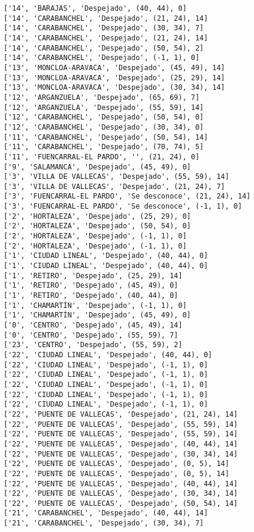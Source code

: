 \documentclass[11pt]{article}
\begin{document}
\begin{Verbatim}[commandchars=\\\{\}]
['14', 'BARAJAS', 'Despejado', (40, 44), 0]
['14', 'CARABANCHEL', 'Despejado', (21, 24), 14]
['14', 'CARABANCHEL', 'Despejado', (30, 34), 7]
['14', 'CARABANCHEL', 'Despejado', (21, 24), 14]
['14', 'CARABANCHEL', 'Despejado', (50, 54), 2]
['14', 'CARABANCHEL', 'Despejado', (-1, 1), 0]
['13', 'MONCLOA-ARAVACA', 'Despejado', (45, 49), 14]
['13', 'MONCLOA-ARAVACA', 'Despejado', (25, 29), 14]
['13', 'MONCLOA-ARAVACA', 'Despejado', (30, 34), 14]
['12', 'ARGANZUELA', 'Despejado', (65, 69), 7]
['12', 'ARGANZUELA', 'Despejado', (55, 59), 14]
['12', 'CARABANCHEL', 'Despejado', (50, 54), 0]
['12', 'CARABANCHEL', 'Despejado', (30, 34), 0]
['11', 'CARABANCHEL', 'Despejado', (50, 54), 14]
['11', 'CARABANCHEL', 'Despejado', (70, 74), 5]
['11', 'FUENCARRAL-EL PARDO', '', (21, 24), 0]
['9', 'SALAMANCA', 'Despejado', (45, 49), 0]
['3', 'VILLA DE VALLECAS', 'Despejado', (55, 59), 14]
['3', 'VILLA DE VALLECAS', 'Despejado', (21, 24), 7]
['3', 'FUENCARRAL-EL PARDO', 'Se desconoce', (21, 24), 14]
['3', 'FUENCARRAL-EL PARDO', 'Se desconoce', (-1, 1), 0]
['2', 'HORTALEZA', 'Despejado', (25, 29), 0]
['2', 'HORTALEZA', 'Despejado', (50, 54), 0]
['2', 'HORTALEZA', 'Despejado', (-1, 1), 0]
['2', 'HORTALEZA', 'Despejado', (-1, 1), 0]
['1', 'CIUDAD LINEAL', 'Despejado', (40, 44), 0]
['1', 'CIUDAD LINEAL', 'Despejado', (40, 44), 0]
['1', 'RETIRO', 'Despejado', (25, 29), 14]
['1', 'RETIRO', 'Despejado', (45, 49), 0]
['1', 'RETIRO', 'Despejado', (40, 44), 0]
['1', 'CHAMARTÍN', 'Despejado', (-1, 1), 0]
['1', 'CHAMARTÍN', 'Despejado', (45, 49), 0]
['0', 'CENTRO', 'Despejado', (45, 49), 14]
['0', 'CENTRO', 'Despejado', (55, 59), 7]
['23', 'CENTRO', 'Despejado', (55, 59), 2]
['22', 'CIUDAD LINEAL', 'Despejado', (40, 44), 0]
['22', 'CIUDAD LINEAL', 'Despejado', (-1, 1), 0]
['22', 'CIUDAD LINEAL', 'Despejado', (-1, 1), 0]
['22', 'CIUDAD LINEAL', 'Despejado', (-1, 1), 0]
['22', 'CIUDAD LINEAL', 'Despejado', (-1, 1), 0]
['22', 'CIUDAD LINEAL', 'Despejado', (-1, 1), 0]
['22', 'PUENTE DE VALLECAS', 'Despejado', (21, 24), 14]
['22', 'PUENTE DE VALLECAS', 'Despejado', (55, 59), 14]
['22', 'PUENTE DE VALLECAS', 'Despejado', (55, 59), 14]
['22', 'PUENTE DE VALLECAS', 'Despejado', (40, 44), 14]
['22', 'PUENTE DE VALLECAS', 'Despejado', (30, 34), 14]
['22', 'PUENTE DE VALLECAS', 'Despejado', (0, 5), 14]
['22', 'PUENTE DE VALLECAS', 'Despejado', (0, 5), 14]
['22', 'PUENTE DE VALLECAS', 'Despejado', (40, 44), 14]
['22', 'PUENTE DE VALLECAS', 'Despejado', (30, 34), 14]
['22', 'PUENTE DE VALLECAS', 'Despejado', (50, 54), 14]
['21', 'CARABANCHEL', 'Despejado', (40, 44), 14]
['21', 'CARABANCHEL', 'Despejado', (30, 34), 7]

\end{Verbatim}
\end{document}
